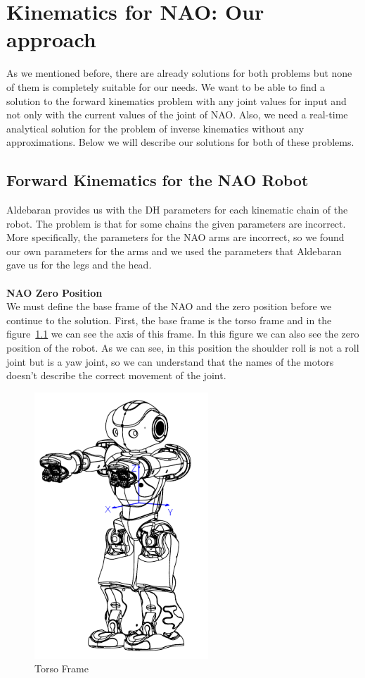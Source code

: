 \chapter{Kinematics for NAO: Our approach}
\label{approach}
As we mentioned before, there are already solutions for both problems but none of them is completely suitable for our needs. We want to be able to find a solution to the forward kinematics problem with any joint values for input and not only with the current values of the joint of NAO. Also, we need a real-time analytical solution for the problem of inverse kinematics without any approximations. Below we will describe our solutions for both of these problems.
\section{Forward Kinematics for the NAO Robot}
Aldebaran provides us with the DH parameters for each kinematic chain of the robot. The problem is that for some chains the given parameters are incorrect. More specifically, the parameters for the NAO arms are incorrect, so we found our own parameters for the arms and we used the parameters that Aldebaran gave us for the legs and the head.\\
\\

\textbf{NAO Zero Position}\\
We must define the base frame of the NAO and the zero position before we continue to the solution. First, the base frame is the torso frame and in the figure~\ref{fig:torso} we can see the axis of this frame. In this figure we can also see the zero position of the robot. As we can see, in this position the shoulder roll is not a roll joint but is a yaw joint, so we can understand that the names of the motors doesn't describe the correct movement of the joint.

\begin{figure}[h]
	\begin{center}
		\includegraphics[height = 10cm]{Figures/torso_frame.png}
 		\caption{Torso Frame}
 		\label{fig:torso}
	\end{center}
\end{figure}


